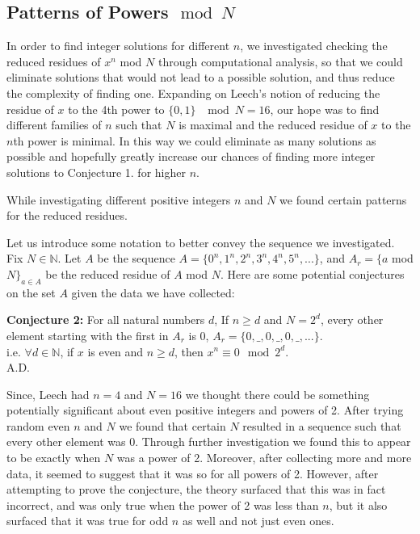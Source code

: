 \documentclass{article}
\begin{document}
\begin{flushleft}
\section{Patterns of Powers$\mod N$}
In order to find integer solutions for different $n$, we investigated checking the reduced residues of $x^n$ mod $N$ through computational analysis, so that we could eliminate solutions that would not lead to a possible solution, and thus reduce the complexity of finding one. Expanding on Leech's \cite{leech} notion of reducing the residue of $x$ to the 4th power to $\{0,1\}$ $\mod N=16$, our hope was to find different families of $n$ such that $N$ is maximal and the reduced residue of $x$ to the $n$th power is minimal. In this way we could eliminate as many solutions as possible and hopefully greatly increase our chances of finding more integer solutions to Conjecture 1. for higher $n$. 

\vspace{.1in}

While investigating different positive integers $n$ and $N$ we found certain patterns for the reduced residues. 

\vspace{.1in}

Let us introduce some notation to better convey the sequence we investigated. Fix $N\in\mathbb{N}$. Let $A$ be the sequence $A = \{0^n,1^n,2^n,3^n,4^n,5^n,...\}$, and $A_r = \{a$ mod $N\}_{a\in A}$ be the reduced residue of $A$ mod $N$. Here are some potential conjectures on the set $A$ given the data we have collected:

\vspace{.1in}

{\bf Conjecture 2:} For all natural numbers $d$, If $n\ge d$ and $N=2^d$, every other element starting with the first in $A_r$ is $0$, $A_r=\{0,\_,0,\_,0,\_,...\}$. \\
    \hspace{.2in} i.e. $\forall d\in{\mathbb{N}}$, if $x$ is even and $n\ge d$, then $x^n\equiv 0\mod 2^d$. \\
    \hspace{4.3in} A.D.

    Since, Leech \cite{leech} had $n=4$ and $N=16$ we thought there could be something potentially significant about even positive integers and powers of 2. After trying random even $n$ and $N$ we found that certain $N$ resulted in a sequence such that every other element was 0. Through further investigation we found this to appear to be exactly when $N$ was a power of 2. Moreover, after collecting more and more data, it seemed to suggest that it was so for all powers of 2. However, after attempting to prove the conjecture, the theory surfaced that this was in fact incorrect, and was only true when the power of 2 was less than $n$, but it also surfaced that it was true for odd $n$ as well and not just even ones.


\end{flushleft}
\end{document}
